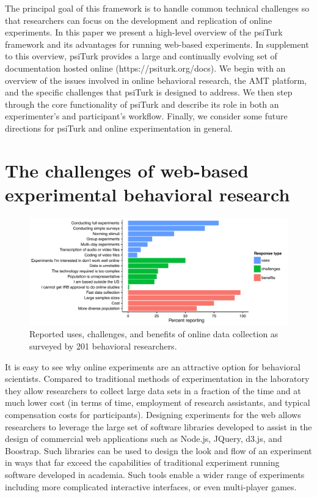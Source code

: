 \documentclass[twocolumn]{svjour3}          %
\begin{document}
The principal goal of this framework is to handle common technical 
challenges so that researchers can focus on the development and replication
of online experiments.  In this paper we present a high-level overview of the 
\textsf{psiTurk} framework and its advantages for running web-based experiments.
In supplement to this overview, \textsf{psiTurk} provides a large and continually
evolving set of documentation hosted online (\textsf{https://psiturk.org/docs}).
We begin with an overview of the issues involved in online 
behavioral research,  the AMT platform, and the specific challenges that \textsf{psiTurk} is designed to 
address.  We then  step through the core functionality of \textsf{psiTurk} and 
describe its role in both an experimenter's and participant's workflow.  Finally, we
consider some future directions for \textsf{psiTurk} and online experimentation in 
general.



\section{The challenges of web-based experimental behavioral research}

\begin{figure}[tp]
\centering
\includegraphics[width=\textwidth]{figures/combinedquestionsedited.pdf}
\caption{Reported uses, challenges, and benefits of online data collection as surveyed
by 201 behavioral researchers.}
\label{fig:survey}
\end{figure}

It is easy to see why online experiments are an attractive option for behavioral 
scientists.  Compared to traditional methods of experimentation in the laboratory
they allow researchers to collect large data sets in a fraction of the time and at 
much lower cost (in terms of time, employment of research assistants, and typical 
compensation costs for participants).  Designing experiments for the web allows 
researchers to leverage the large set of software libraries developed to assist 
in the design of commercial web applications such as Node.js, JQuery, d3.js, 
and Boostrap.  Such libraries can be used to design the look and flow of an 
experiment in ways 
that far exceed the capabilities of traditional experiment running software developed 
in academia.  Such tools enable a wider range of experiments including more 
complicated interactive interfaces, or even multi-player games.
\end{document}
